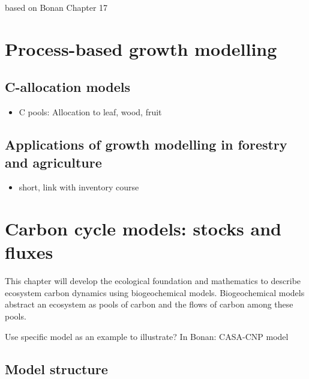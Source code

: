 \documentclass[
  oneside]{book}
\providecommand{\tightlist}{%
  \setlength{\itemsep}{0pt}\setlength{\parskip}{0pt}}
\begin{document}
based on Bonan Chapter 17

\hypertarget{process-based-growth-modelling}{%
\section{Process-based growth modelling}\label{process-based-growth-modelling}}

\hypertarget{c-allocation-models}{%
\subsection{C-allocation models}\label{c-allocation-models}}

\begin{itemize}
\tightlist
\item
  C pools: Allocation to leaf, wood, fruit
\end{itemize}

\hypertarget{applications-of-growth-modelling-in-forestry-and-agriculture}{%
\subsection{Applications of growth modelling in forestry and agriculture}\label{applications-of-growth-modelling-in-forestry-and-agriculture}}

\begin{itemize}
\tightlist
\item
  short, link with inventory course
\end{itemize}

\hypertarget{carbon-cycle-models-stocks-and-fluxes}{%
\section{Carbon cycle models: stocks and fluxes}\label{carbon-cycle-models-stocks-and-fluxes}}

This chapter will develop the ecological foundation and mathematics to describe ecosystem carbon dynamics using biogeochemical models.
Biogeochemical models abstract an ecosystem as pools of carbon and the flows of carbon among these pools.

Use specific model as an example to illustrate? In Bonan: CASA-CNP model

\hypertarget{model-structure}{%
\subsection{Model structure}\label{model-structure}}
\end{document}
